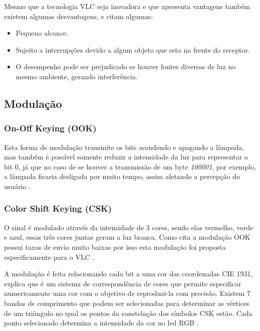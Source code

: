 Mesmo que a tecnologia VLC seja inovadora e que apresenta vantagens também existem algumas desvantagens,  e  citam algumas:

\begin{itemize}
  \item Pequeno alcance.
  \item Sujeito a interrupções devido a algum objeto que esta na frente do receptor.
  \item O desempenho pode ser prejudicado se houver fontes diversas de luz no mesmo ambiente, gerando interferência.
\end{itemize}

\subsection{Modulação}

\subsubsection{On-Off Keying (OOK)}

Esta forma de modulação transmite os bits acendendo e apagando a lâmpada, mas também é possível somente reduzir a intensidade da luz para representar o bit 0, já que no caso de se houver a transmissão de um byte \emph{100001}, por exemplo, a lâmpada ficaria desligada por muito tempo, assim afetando a percepção do usuário \cite{matheus2017comunicaccao}.

\subsubsection{Color Shift Keying (CSK)}

O sinal é modulado através da intensidade de 3 cores, sendo elas vermelho, verde e azul, essas três cores juntas geram a luz branca. Como cita  a modulação OOK possui taxas de envio muito baixas por isso esta modulação foi proposta especificamente para o VLC \cite{matheus2017comunicaccao}. 

A modulação é feita relacionando cada bit a uma cor das coordenadas CIE 1931,  explica que é um sistema de correspondência de cores que permite especificar numericamente uma cor com o objetivo de reproduzi-la com precisão. Existem 7 bandas de comprimento que podem ser selecionadas para determinar as vértices de um triângulo no qual os pontos da constelação dos símbolos CSK estão. Cada ponto selecionado determina a intensidade da cor no led RGB \cite{matheus2017comunicaccao}. \newline

